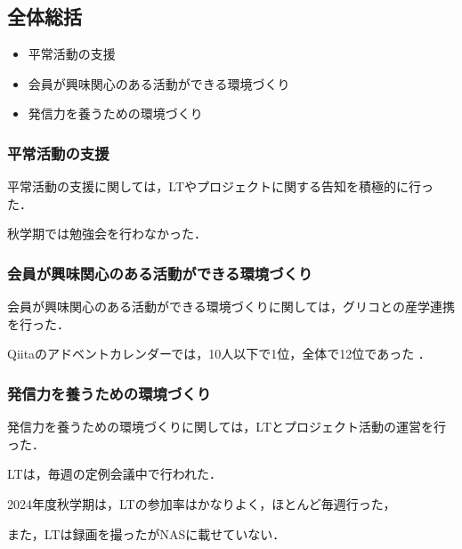 \subsection {全体総括}


\begin{itemize}
    \item 平常活動の支援
    \item 会員が興味関心のある活動ができる環境づくり
    \item 発信力を養うための環境づくり
\end{itemize}

\subsubsection {平常活動の支援}
平常活動の支援に関しては，LTやプロジェクトに関する告知を積極的に行った．

秋学期では勉強会を行わなかった．　

\subsubsection {会員が興味関心のある活動ができる環境づくり}
会員が興味関心のある活動ができる環境づくりに関しては，グリコとの産学連携を行った．

Qiitaのアドベントカレンダーでは，10人以下で1位，全体で12位であった  ．


\subsubsection {発信力を養うための環境づくり}
発信力を養うための環境づくりに関しては，LTとプロジェクト活動の運営を行った．

LTは，毎週の定例会議中で行われた．

2024年度秋学期は，LTの参加率はかなりよく，ほとんど毎週行った，

また，LTは録画を撮ったがNASに載せていない．
